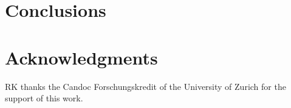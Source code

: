 \documentclass{ws-procs975x65}
\newcommand{\sw}{Space Warps\xspace}
\newcommand{\Mlens}{\ensuremath{\text{M}_\text{lens}}\xspace}
\newcommand{\Mstel}{\ensuremath{\text{M}_\odot}\xspace}
\newcommand{\icite}[1]{Ref.~\refcite{#1}}  %
\newcommand{\scite}[1]{\cite{#1}}          %
\newcommand{\figref}[1]{Fig.~\ref{fig:#1}}
\begin{document}
\section{Conclusions}



\section*{Acknowledgments}
RK thanks the Candoc Forschungskredit of the University of Zurich for the support of this work.



\end{document}
